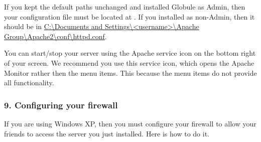 \documentclass[10pt,a4paper]{article}
\makeatletter
\newenvironment{p}{\@open{P}{}}{\@close{P}}
\newenvironment{p}{}{\par}
\makeatother
\begin{document}
\begin{p}
If you kept the default paths unchanged and installed Globule as Admin, then
your configuration file must be located at .  If you installed as non-Admin, then it
should be in {\url{C:\Documents and Settings\<username>\Apache
Group\Apache2\conf\httpd.conf}}.
\end{p}

\begin{p}
You can start/stop your server using the Apache service icon on the bottom
right of your screen.  We recommend you use this service icon, which opens the
Apache Monitor rather then the menu items.  This because the menu items do not
provide all functionality.
\end{p}

\subsubsection*{9. Configuring your firewall}

\begin{p}
If you are using Windows XP, then you must configure your firewall to allow
your friends to access the server you just installed. Here is how to do it.
\end{p}
\end{document}
